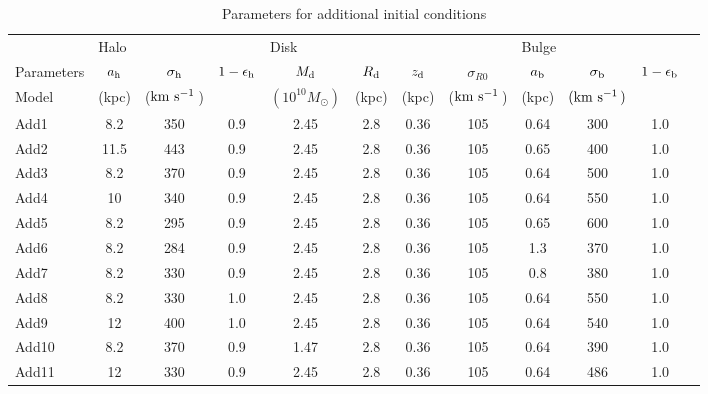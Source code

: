 \begin{table*}
\begin{center}
\caption{Parameters for additional initial conditions\label{tb:models_add}}
\begin{tabular}{lccccccccccc}
\hline
           &  \multicolumn{3}{l}{Halo} &  \multicolumn{4}{l}{Disk} &  \multicolumn{3}{l}{Bulge} \\
Parameters &  $a_{\rm h}$ & $\sigma_{\rm h}$ & $1-\epsilon_{\rm h}$ & $M_{\rm d}$ & $R_{\rm d}$ & $z_{\rm d}$ & $\sigma_{R0}$  & $a_{\rm b}$ & $\sigma_{\rm b}$ & $1-\epsilon_{\rm b}$ \\ 
Model   &  (kpc) & ($\mathrm{km\ s^{-1}}\,$) &  &  $(10^{10}M_{\odot})$ & (kpc) & (kpc) & ($\mathrm{km\ s^{-1}}\,$)  & (kpc) & $(\mathrm{km\ s^{-1}}\,)$\\
\hline \hline
Add1 & 8.2 & 350 & 0.9  & 2.45 & 2.8 & 0.36 & 105 & 0.64 & 300 & 1.0  \\ %
Add2 & 11.5 & 443 & 0.9  & 2.45 & 2.8 & 0.36 & 105 & 0.65 & 400 & 1.0  \\ %
Add3 & 8.2 & 370 & 0.9  & 2.45 & 2.8 & 0.36 & 105 & 0.64 & 500 & 1.0  \\ %
Add4 & 10 & 340 & 0.9  & 2.45 & 2.8 & 0.36 & 105 & 0.64 & 550 & 1.0  \\ %
Add5 & 8.2 & 295 & 0.9  & 2.45 & 2.8 & 0.36 & 105 & 0.65 & 600 & 1.0  \\ %
Add6 & 8.2 & 284 & 0.9  & 2.45 & 2.8 & 0.36 & 105 & 1.3 & 370 & 1.0  \\ %
Add7 & 8.2 & 330 & 0.9  & 2.45 & 2.8 & 0.36 & 105 & 0.8 & 380 & 1.0   \\  %
Add8 & 8.2 & 330 & 1.0  & 2.45 & 2.8 & 0.36 & 105 & 0.64 & 550 & 1.0  \\ %
Add9 & 12 & 400 & 1.0  & 2.45 & 2.8 & 0.36 & 105 & 0.64 & 540 & 1.0  \\ %
Add10 & 8.2 & 370 & 0.9  & 1.47 & 2.8 & 0.36 & 105 & 0.64 & 390 & 1.0  \\ %
Add11 & 12 & 330 & 0.9  & 2.45 & 2.8 & 0.36 & 105 & 0.64 & 486 & 1.0  \\ %
\hline
\end{tabular}
\end{center}
\end{table*}


